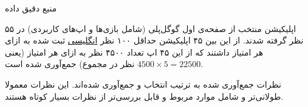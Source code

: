 \Section
{منبع دقیق داده}
{
    ۵۵
    اپلیکیشن منتخب از صفحه‌ی اول گوگل‌پلی (شامل بازی‌ها و اپ‌های کاربردی) در نظر گرفته شدند. از این بین ۴۵ اپلیکیشن حداقل ۱۰۰ نظر
    \underline{انگلیسی}
    ثبت شده به ازای هر امتیاز داشتند که از این ۴۵ اپ تعداد ۴۵۰۰ نظر به ازای هر امتیاز (یعنی
    $4500\times5=22500$
    نظر در مجموع) جمع‌آوری شده است.

    نظرات جمع‌آوری شده به ترتیب 
    انتخاب و جمع‌آوری شده‌اند. این نظرات معمولا طولانی‌تر و شامل موارد مربوط و قابل‌ بررسی‌تر از نظرات بسیار کوتاه هستند.
}
